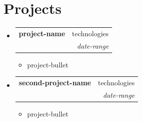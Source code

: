 \documentclass[letterpaper,11pt]{article}
\makeatletter
\newcommand{\resumeItem}[2]{
\item\small{
{\ifx\relax#1\relax\else\textbf{#1}\hspace{0.5mm}\fi#2 \vspace{-1pt}}
}
}
\newcommand{\resumeSubheading}[4]{
\vspace{-2pt}\item
\begin{tabular*}{0.97\textwidth}[t]{l@{\extracolsep{\fill}}r}
\textbf{#1} & #2 \\
\textit{\small#3} & \textit{\small #4} \\
\end{tabular*}\vspace{-7pt}
}
\newcommand{\resumeSubHeadingListStart}{\begin{itemize}[leftmargin=0.15in, label={}]}
\newcommand{\resumeSubHeadingListEnd}{\end{itemize}}
\newcommand{\resumeItemListStart}{\begin{itemize}}
\newcommand{\resumeItemListEnd}{\end{itemize}\vspace{-5pt}}
\newcommand{\resumeSectionTransition}{\vspace{-9mm}}
\makeatother
\begin{document}
\resumeSectionTransition
\section{\textbf{Projects}}
\vspace{-1mm}
\resumeSubHeadingListStart
  \resumeSubheading
    {project-name}
    {technologies}
    {}
    {date-range}
    \resumeItemListStart
      \resumeItem{}{project-bullet}
    \resumeItemListEnd
\resumeSubHeadingListEnd
\vspace{-4mm}
\resumeSubHeadingListStart
  \resumeSubheading
    {second-project-name}
    {technologies}
    {}
    {date-range}
    \resumeItemListStart
      \resumeItem{}{project-bullet}
    \resumeItemListEnd
\resumeSubHeadingListEnd
\vspace{-4mm}
\end{document}
